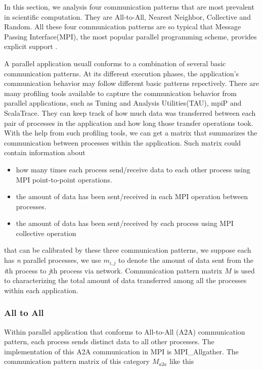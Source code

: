 \documentclass[conference]{IEEEtran}
\begin{document}
In this section, we analysis four communication patterns that are most prevalent in scientific computation.
They are All-to-All, Nearest Neighbor, Collective and Random\cite{roth}. All these four communication patterns are so typical that Message Passing Interface(MPI), the most popular parallel programming scheme, provides explicit support\cite{Pjesivac} \cite{thakur}.

A parallel application usuall conforms to a combination of several basic communication patterns. At its different execution phases, the application's communication behavior may follow different basic patterns repectively. There are many profiling tools available to capture the communication behavior from parallel applications, such as Tuning and Analysis Utilities(TAU)\cite{tau}, mpiP\cite{mpip} and ScalaTrace\cite{scala}. They can keep track of how much data was transferred between each pair of processes in the application and how long those transfer operations took. With the help from such profiling tools, we can get a matrix that summarizes the communication between processes within the application. Such matrix could contain information about

\begin{itemize}
 \item how many times each process send/receive data to each other process using MPI point-to-point operations.
 \item the amount of data has been sent/received in each MPI operation between processes.
 \item the amount of data has been sent/received by each process using MPI collective operation
 
\end{itemize}


that can be calibrated by these three communication patterns, we suppose each has \emph{n} parallel processes, we use $m_{i,j}$ to denote the amount of data sent from the \emph{i}th process to \emph{j}th process via network. Communication pattern matrix $M$ is used to characterizing the total amount of data transferred among all the processes within each application.

\subsubsection{All to All}
\label{sec:all-to-all}

Within parallel application that conforms to All-to-All (A2A) communication pattern, each process sends distinct data to all other processes. The implementation of this A2A communication in MPI is MPI\_Allgather. The communication pattern matrix of this category $M_{a2a}$ like this
\end{document}
